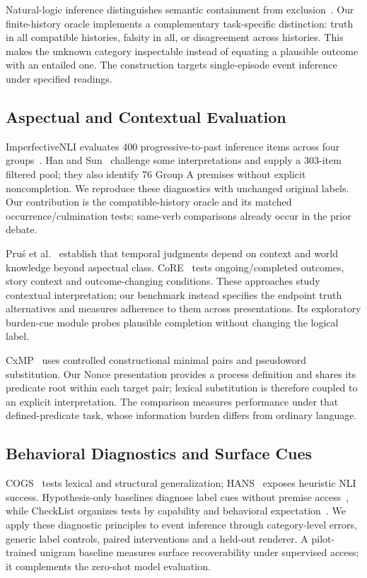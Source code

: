 \documentclass[sigconf,anonymous,review]{acmart}
\begin{document}
Natural-logic inference distinguishes semantic containment from exclusion~\cite{maccartney2008}. Our finite-history oracle implements a complementary task-specific distinction: truth in all compatible histories, falsity in all, or disagreement across histories. This makes the unknown category inspectable instead of equating a plausible outcome with an entailed one. The construction targets single-episode event inference under specified readings.

\subsection{Aspectual and Contextual Evaluation}
ImperfectiveNLI evaluates 400 progressive-to-past inference items across four groups~\cite{ma2026}. Han and Sun~\cite{han2026} challenge some interpretations and supply a 303-item filtered pool; they also identify 76 Group A premises without explicit noncompletion. We reproduce these diagnostics with unchanged original labels. Our contribution is the compatible-history oracle and its matched occurrence/culmination tests; same-verb comparisons already occur in the prior debate.

Pru\'{s} et al.~\cite{prus2024,prus2025} establish that temporal judgments depend on context and world knowledge beyond aspectual class. CoRE~\cite{core2025} tests ongoing/completed outcomes, story context and outcome-changing conditions. These approaches study contextual interpretation; our benchmark instead specifies the endpoint truth alternatives and measures adherence to them across presentations. Its exploratory burden-cue module probes plausible completion without changing the logical label.

CxMP~\cite{cxmp2026} uses controlled constructional minimal pairs and pseudoword substitution. Our Nonce presentation provides a process definition and shares its predicate root within each target pair; lexical substitution is therefore coupled to an explicit interpretation. The comparison measures performance under that defined-predicate task, whose information burden differs from ordinary language.

\subsection{Behavioral Diagnostics and Surface Cues}
COGS~\cite{cogs2020} tests lexical and structural generalization; HANS~\cite{hans2019} exposes heuristic NLI success. Hypothesis-only baselines diagnose label cues without premise access~\cite{poliak2018}, while CheckList organizes tests by capability and behavioral expectation~\cite{checklist2020}. We apply these diagnostic principles to event inference through category-level errors, generic label controls, paired interventions and a held-out renderer. A pilot-trained unigram baseline measures surface recoverability under supervised access; it complements the zero-shot model evaluation.
\end{document}
